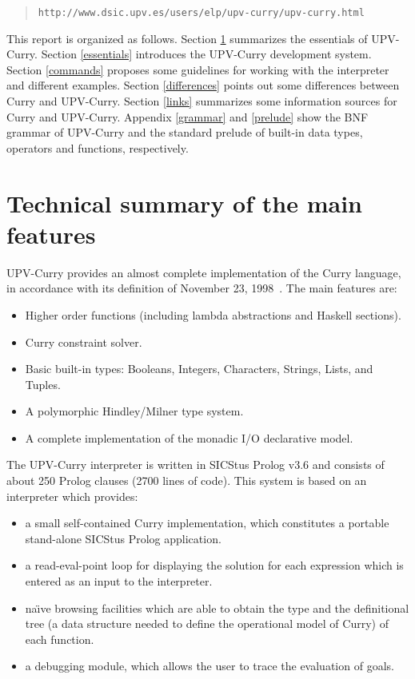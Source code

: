 \documentclass[titlepage,fleqn]{article}
\begin{document}
\begin{quote}
\verb_http://www.dsic.upv.es/users/elp/upv-curry/upv-curry.html_
\end{quote}

This report is organized as follows. 
Section \ref{summary} summarizes the essentials of UPV-Curry. 
Section \ref{essentials} introduces the UPV-Curry development system.
Section \ref{commands} proposes some guidelines for working with 
the interpreter and different examples.
Section \ref{differences} points out some
differences between Curry and UPV-Curry.
Section \ref{links} summarizes some information sources for Curry
and UPV-Curry.
Appendix \ref{grammar} and \ref{prelude} show
the BNF grammar of UPV-Curry and the standard prelude of built-in data types,
operators and functions, respectively.

\section{Technical summary of the main features}\label{summary}

UPV-Curry provides an almost complete implementation of the Curry language,
in accordance with its definition of November 23, 1998~\cite{Hanus98Curry}. 
The main features are:
\begin{itemize}
\item Higher order functions (including lambda abstractions and 
Haskell sections).
\item Curry constraint solver.
\item Basic built-in types: Booleans, Integers, 
Characters, Strings, Lists, and Tuples.
\item A polymorphic Hindley/Milner type system.
\item A complete implementation of the monadic I/O declarative model.
\end{itemize}

\noindent
The UPV-Curry interpreter is written in SICStus Prolog v3.6 and 
consists of about 250 Prolog clauses (2700 lines of code).
This system is based on an interpreter which provides:
\begin{itemize}
\item a small self-contained Curry implementation, 
which constitutes a portable stand-alone SICStus Prolog application.
\item a read-eval-point loop for displaying the solution
for each expression which
is entered as an input to the interpreter.
\item na\"{\i}ve browsing facilities which are able to obtain the type and 
the definitional tree (a data structure 
needed to define the operational model
of Curry) of each function.
\item a debugging module, which allows the user to trace 
the evaluation of goals.
\end{itemize}
\end{document}
